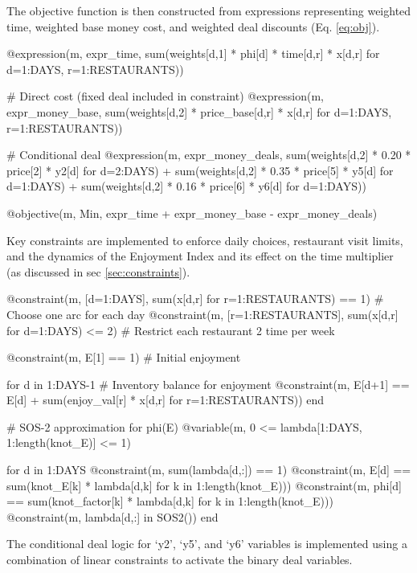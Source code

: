 \documentclass{article}
\begin{document}
The objective function is then constructed from expressions representing weighted time, weighted base money cost, and weighted deal discounts (Eq. \ref{eq:obj}).

\begin{shadowminted}
    @expression(m, expr_time,
    sum(weights[d,1] * phi[d] * time[d,r] * x[d,r] for d=1:DAYS, r=1:RESTAURANTS))

# Direct cost (fixed deal included in constraint)
@expression(m, expr_money_base,
    sum(weights[d,2] * price_base[d,r] * x[d,r] for d=1:DAYS, r=1:RESTAURANTS))

# Conditional deal 
@expression(m, expr_money_deals,
      sum(weights[d,2] * 0.20 * price[2] * y2[d] for d=2:DAYS) +
      sum(weights[d,2] * 0.35 * price[5] * y5[d] for d=1:DAYS) +
      sum(weights[d,2] * 0.16 * price[6] * y6[d] for d=1:DAYS)) 

@objective(m, Min, expr_time + expr_money_base - expr_money_deals)

\end{shadowminted}

Key constraints are implemented to enforce daily choices, restaurant visit limits, and the dynamics of the Enjoyment Index and its effect on the time multiplier (as discussed in sec \ref{sec:constraints}).

\begin{shadowminted}
    @constraint(m, [d=1:DAYS], sum(x[d,r] for r=1:RESTAURANTS) == 1) # Choose one arc for each day
@constraint(m, [r=1:RESTAURANTS], sum(x[d,r] for d=1:DAYS) <= 2) # Restrict each restaurant 2 time per week

@constraint(m, E[1] == 1) # Initial enjoyment

for d in 1:DAYS-1 # Inventory balance for enjoyment
    @constraint(m, E[d+1] == E[d] + sum(enjoy_val[r] * x[d,r] for r=1:RESTAURANTS))
end

# SOS-2 approximation for phi(E)
@variable(m, 0 <= lambda[1:DAYS, 1:length(knot_E)] <= 1)

for d in 1:DAYS
    @constraint(m, sum(lambda[d,:]) == 1)
    @constraint(m, E[d] == sum(knot_E[k] * lambda[d,k] for k in 1:length(knot_E)))
    @constraint(m, phi[d] == sum(knot_factor[k] * lambda[d,k] for k in 1:length(knot_E)))
    @constraint(m, lambda[d,:] in SOS2())
end
\end{shadowminted}

The conditional deal logic for `y2', `y5', and `y6' variables is implemented using a combination of linear constraints to activate the binary deal variables.
\end{document}
